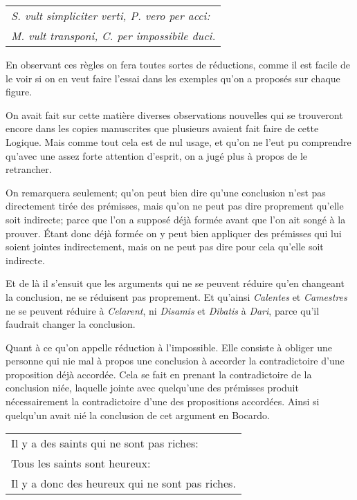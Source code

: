 \begin{center}
	\begin{tabular}{l}
		\emph{S. vult simpliciter verti, P. vero per acci:} \\
		\emph{M. vult transponi, C. per impossibile duci.} \\
	\end{tabular}
\end{center}

En observant ces règles on fera toutes sortes de réductions, comme il est facile de le voir si on en veut faire l'essai dans les exemples qu'on a proposés sur chaque figure.

On avait fait sur cette matière diverses observations nouvelles qui se trouveront encore dans les copies manuscrites que plusieurs avaient fait faire de cette Logique. Mais comme tout cela est de nul usage, et qu'on ne l'eut pu comprendre qu'avec une assez forte attention d'esprit, on a jugé plus à propos de le retrancher.

On remarquera seulement; qu'on peut bien dire qu'une conclusion n'est pas directement tirée des prémisses, mais qu'on ne peut pas dire proprement qu'elle soit indirecte; parce que l'on a supposé déjà formée avant que l'on ait songé à la prouver. Étant donc déjà formée on y peut bien appliquer des prémisses qui lui soient jointes indirectement, mais on ne peut pas dire pour cela qu'elle soit indirecte.

Et de là il s'ensuit que les arguments qui ne se peuvent réduire qu'en changeant la conclusion, ne se réduisent pas proprement. Et qu'ainsi \emph{Calentes} et \emph{Camestres} ne se peuvent réduire à \emph{Celarent}, ni \emph{Disamis} et \emph{Dibatis} à \emph{Dari}, parce qu'il faudrait changer la conclusion.

Quant à ce qu'on appelle réduction à l'impossible. Elle consiste à obliger une personne qui nie mal à propos une conclusion à accorder la contradictoire d'une proposition déjà accordée. Cela se fait en prenant la contradictoire de la conclusion niée, laquelle jointe avec quelqu'une des prémisses produit nécessairement la contradictoire d'une des propositions accordées. Ainsi si quelqu'un avait nié la conclusion de cet argument en Bocardo.

\begin{center}
	\begin{tabular}{l}
		Il y a des saints qui ne sont pas riches: \\
		Tous les saints sont heureux: \\
		Il y a donc des heureux qui ne sont pas riches. \\
	\end{tabular}
\end{center}


